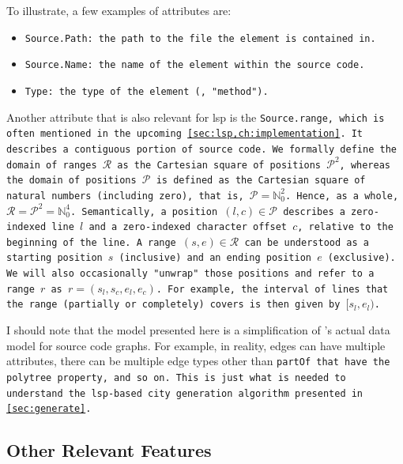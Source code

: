 \documentclass[../thesis]{subfiles}
\begin{document}
To illustrate, a few examples of attributes are:
\begin{itemize}
	\item \tt{Source.Path}: the path to the file the element is contained in.
	\item \tt{Source.Name}: the name of the element within the source code.
	\item \tt{Type}: the type of the element (\eg{}, "method").
\end{itemize}

Another attribute that is also relevant for \gls{lsp} is the \tt{Source.\allowbreak\Gls*{range}}, which is often mentioned in the upcoming \cref{sec:lsp,ch:implementation}.
It describes a contiguous portion of source code.
We formally define the domain of ranges $\mathcal{R}$ as the Cartesian square of positions $\mathcal{P}^2$, whereas the domain of positions $\mathcal{P}$ is defined as the Cartesian square of natural numbers (including zero), that is, $\mathcal{P} = \mathbb{N}^2_0$.
Hence, as a whole, $\mathcal{R} = \mathcal{P}^2 = \mathbb{N}^4_0$.
Semantically, a position $(l, c) \in \mathcal{P}$ describes a zero-indexed line $l$ and a zero-indexed character offset $c$, relative to the beginning of the line.
A range $(s, e) \in \mathcal{R}$ can be understood as a starting position $s$ (inclusive) and an ending position $e$ (exclusive).
We will also occasionally "unwrap" those positions and refer to a range $r$ as $r = ({s_l}, {s_c}, {e_l}, {e_c})$.
For example, the interval of lines that the range (partially or completely) covers is then given by $[s_l, e_l)$.

I should note that the model presented here is a simplification of \SEE{}'s actual data model for source code graphs.
For example, in reality, edges can have multiple attributes, there can be multiple edge types other than \tt{partOf} that have the \gls{polytree} property, and so on.
This is just what is needed to understand the \gls{lsp}-based city generation algorithm presented in \cref{sec:generate}.



\subsection{Other Relevant Features}\label{subsec:seeother}
\end{document}
